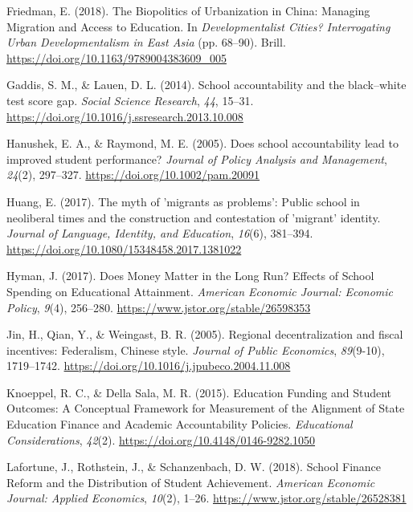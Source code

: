 \documentclass[
  man,
  floatsintext,
  longtable,
  nolmodern,
  notxfonts,
  notimes,
  colorlinks=true,linkcolor=blue,citecolor=blue,urlcolor=blue]{apa7}
\newlength{\cslhangindent}
\newenvironment{CSLReferences}[2] %
 {\begin{list}{}{%
  \setlength{\itemindent}{0pt}
  \setlength{\leftmargin}{0pt}
  \setlength{\parsep}{0pt}
  \ifodd #1
   \setlength{\leftmargin}{\cslhangindent}
   \setlength{\itemindent}{-1\cslhangindent}
  \fi
  \setlength{\itemsep}{#2\baselineskip}}}
 {\end{list}}
\begin{document}
\begin{CSLReferences}{1}{0}
Friedman, E. (2018). The {Biopolitics} of {Urbanization} in {China}:
{Managing Migration} and {Access} to {Education}. In
\emph{Developmentalist {Cities}? {Interrogating Urban Developmentalism}
in {East Asia}} (pp. 68--90). Brill.
\url{https://doi.org/10.1163/9789004383609_005}

Gaddis, S. M., \& Lauen, D. L. (2014). School accountability and the
black--white test score gap. \emph{Social Science Research}, \emph{44},
15--31. \url{https://doi.org/10.1016/j.ssresearch.2013.10.008}

Hanushek, E. A., \& Raymond, M. E. (2005). Does school accountability
lead to improved student performance? \emph{Journal of Policy Analysis
and Management}, \emph{24}(2), 297--327.
\url{https://doi.org/10.1002/pam.20091}

Huang, E. (2017). The myth of 'migrants as problems': {Public} school in
neoliberal times and the construction and contestation of 'migrant'
identity. \emph{Journal of Language, Identity, and Education},
\emph{16}(6), 381--394.
\url{https://doi.org/10.1080/15348458.2017.1381022}

Hyman, J. (2017). Does {Money Matter} in the {Long Run}? {Effects} of
{School Spending} on {Educational Attainment}. \emph{American Economic
Journal: Economic Policy}, \emph{9}(4), 256--280.
\url{https://www.jstor.org/stable/26598353}

Jin, H., Qian, Y., \& Weingast, B. R. (2005). Regional decentralization
and fiscal incentives: {Federalism}, {Chinese} style. \emph{Journal of
Public Economics}, \emph{89}(9-10), 1719--1742.
\url{https://doi.org/10.1016/j.jpubeco.2004.11.008}

Knoeppel, R. C., \& Della Sala, M. R. (2015). Education {Funding} and
{Student Outcomes}: {A Conceptual Framework} for {Measurement} of the
{Alignment} of {State Education Finance} and {Academic Accountability
Policies}. \emph{Educational Considerations}, \emph{42}(2).
\url{https://doi.org/10.4148/0146-9282.1050}

Lafortune, J., Rothstein, J., \& Schanzenbach, D. W. (2018). School
{Finance Reform} and the {Distribution} of {Student Achievement}.
\emph{American Economic Journal: Applied Economics}, \emph{10}(2),
1--26. \url{https://www.jstor.org/stable/26528381}


\end{CSLReferences}
\end{document}
